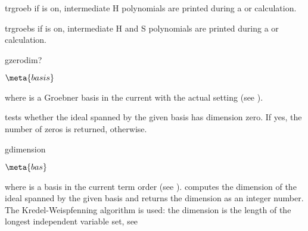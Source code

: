 \begin{Switch}{trgroeb}
if  is on, intermediate H polynomials are 
printed during a  
or  calculation.
\end{Switch}

\begin{Switch}{trgroebs}
if  is on, intermediate H and S polynomials are 
printed during a  or  calculation.
\end{Switch}

\begin{Operator}{gzerodim?} 
\begin{Syntax}

  \(\meta{basis}\)

\end{Syntax}
where  is a Groebner basis in the current 
 with the actual setting 
(see ). 


 tests whether the ideal spanned by the given basis 
has dimension zero. If yes, the number of zeros is returned,
 otherwise.
\end{Operator}


\begin{Operator}{gdimension}
\begin{Syntax}

     \(\meta{bas}\) 

\end{Syntax}
where  is a  basis in the current
term order (see ). 
 computes the dimension of the ideal
spanned by the given basis and returns the dimension as an integer
number. The Kredel-Weispfenning algorithm is used: the dimension
is the length of the longest independent variable set,
see 
\end{Operator}



